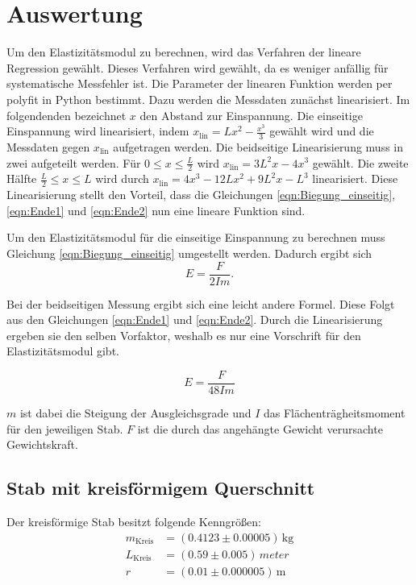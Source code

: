


\section{Auswertung}
Um den Elastizitätsmodul zu berechnen, wird das Verfahren der lineare Regression gewählt. Dieses Verfahren wird gewählt, 
da es weniger anfällig für systematische Messfehler ist. Die Parameter der linearen Funktion werden per polyfit in Python 
bestimmt. Dazu werden die Messdaten 
zunächst linearisiert. Im folgendenden bezeichnet $x$ den Abstand zur Einspannung.
Die einseitige Einspannung wird linearisiert, indem $x_\text{lin} = L x^2 - \frac{x^3}{3}$ 
gewählt wird und die Messdaten gegen $x_\text{lin}$ aufgetragen werden.
Die beidseitige Linearisierung muss in zwei aufgeteilt werden. Für $0 \leq x \leq \frac{L}{2} $ wird 
$x_\text{lin} = 3L^2 x - 4x^3 $ gewählt. Die zweite Hälfte $\frac{L}{2} \leq x \leq L$ wird durch 
$x_\text{lin} = 4x^3 - 12 L x^2 + 9L^2 x -L^3 $ linearisiert.
Diese Linearisierung stellt den Vorteil, dass die Gleichungen \eqref{eqn:Biegung_einseitig}, \eqref{eqn:Ende1} und 
\eqref{eqn:Ende2} nun eine lineare Funktion sind. 

\noindent Um den Elastizitätsmodul für die einseitige Einspannung zu berechnen muss Gleichung \eqref{eqn:Biegung_einseitig} 
umgestellt werden. Dadurch ergibt sich 
\begin{equation}
    E=\frac{F}{2Im}.
    \label{eqn:E_e}
\end{equation}

\noindent Bei der beidseitigen Messung ergibt sich eine leicht andere Formel. Diese Folgt aus den Gleichungen \eqref{eqn:Ende1} 
und \eqref{eqn:Ende2}. Durch die Linearisierung ergeben sie den selben Vorfaktor, weshalb es nur eine Vorschrift für 
den Elastizitätsmodul gibt.

\begin{equation}
    E = \frac{F}{48 I m}
    \label{eqn:E_b}
\end{equation}

\noindent $m$ ist dabei die Steigung der Ausgleichsgrade und $I$ das Flächenträgheitsmoment für den jeweiligen Stab. 
$F$ ist die durch das angehängte Gewicht verursachte Gewichtskraft.

\label{sec:Auswertung}

\subsection{Stab mit kreisförmigem Querschnitt}
\label{sec:rund}
Der kreisförmige Stab besitzt folgende Kenngrößen:
\begin{align*}
    m_\text{Kreis} &= \left(0.4123 \pm 0.00005\right)\,\unit{\kilo \gram} \\
    L_\text{Kreis} &= \left(0.59 \pm 0.005\right)\,\unit{meter}\\
    r &= \left(0.01 \pm 0.000005\right) \, \unit{\meter}
\end{align*}



